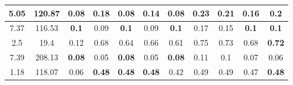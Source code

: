 \documentclass[10pt]{article}
\begin{document}
\begin{tabular}{|c|c|c|c|c|c|c|c|c|c|c|}
  \\
 \hline 
5.05  &120.87  &0.08  &0.18  &0.08  &0.14  &0.08  &0.23  &0.21  &0.16  &\textbf{0.2}
  \\
 \hline 
7.37  &116.53  &\textbf{0.1}
  &0.09  &\textbf{0.1}
  &0.09  &\textbf{0.1}
  &0.17  &0.15  &\textbf{0.1}
  &\textbf{0.1}
  \\
 \hline 
2.5  &19.4  &0.12  &0.68  &0.64  &0.66  &0.61  &0.75  &0.73  &0.68  &\textbf{0.72}
  \\
 \hline 
7.39  &208.13  &\textbf{0.08}
  &0.05  &\textbf{0.08}
  &0.05  &\textbf{0.08}
  &0.11  &0.1  &0.07  &0.06  \\
 \hline 
1.18  &118.07  &0.06  &\textbf{0.48}
  &\textbf{0.48}
  &\textbf{0.48}
  &0.42  &0.49  &0.49  &0.47  &\textbf{0.48}
  \\
 \hline 

\end{tabular}
\end{document}
